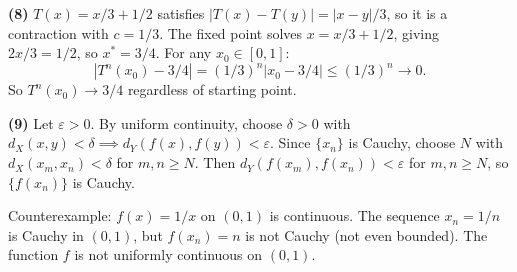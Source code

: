 \documentclass{report}
\begin{document}
\begin{solution}
\textbf{(8)} \(T(x) = x/3 + 1/2\) satisfies \(|T(x) - T(y)| = |x - y|/3\), so it is a contraction with \(c = 1/3\). The fixed point solves \(x = x/3 + 1/2\), giving \(2x/3 = 1/2\), so \(x^* = 3/4\). For any \(x_0 \in [0, 1]\):
\[|T^n(x_0) - 3/4| = (1/3)^n |x_0 - 3/4| \leq (1/3)^n \to 0.\]
So \(T^n(x_0) \to 3/4\) regardless of starting point.

\textbf{(9)} Let \(\varepsilon > 0\). By uniform continuity, choose \(\delta > 0\) with \(d_X(x, y) < \delta \implies d_Y(f(x), f(y)) < \varepsilon\). Since \(\{x_n\}\) is Cauchy, choose \(N\) with \(d_X(x_m, x_n) < \delta\) for \(m, n \geq N\). Then \(d_Y(f(x_m), f(x_n)) < \varepsilon\) for \(m, n \geq N\), so \(\{f(x_n)\}\) is Cauchy.

Counterexample: \(f(x) = 1/x\) on \((0, 1)\) is continuous. The sequence \(x_n = 1/n\) is Cauchy in \((0, 1)\), but \(f(x_n) = n\) is not Cauchy (not even bounded). The function \(f\) is not uniformly continuous on \((0, 1)\).
\end{solution}
\end{document}
